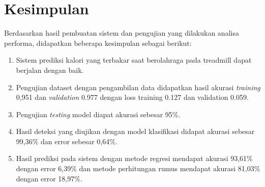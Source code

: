 \section{Kesimpulan}
\label{sec:kesimpulan}

Berdasarkan hasil pembuatan sistem dan pengujian yang dilakukan analisa performa, didapatkan beberapa kesimpulan sebagai berikut:

\begin{enumerate}
    \item Sistem prediksi kalori yang terbakar saat berolahraga pada treadmill dapat berjalan dengan baik.
    \item Pengujian dataset dengan pengambilan data didapatkan hasil akurasi \emph{training} 0,951 dan \emph{validation} 0.977 dengan loss training 0.127 dan validation 0.059.
    \item Pengujian \emph{testing} model diapat akurasi sebesar 95\%.
    \item Hasil deteksi yang diujikan dengan model klasifikasi didapat akurasi sebesar 99,36\% dan error sebesar 0,64\%.
    \item Hasil prediksi pada sistem dengan metode regresi mendapat akurasi 93,61\% dengan error 6,39\% dan metode perhitungan rumus mendapat akurasi 81,03\% dengan error 18,97\%.
\end{enumerate}